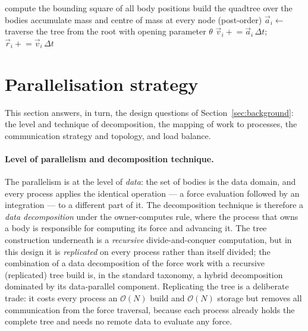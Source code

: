 \documentclass[11pt,a4paper]{article}
\begin{document}
\begin{algorithm}[H]
\caption{One Barnes--Hut time step (sequential).}
\label{alg:serial}
\begin{algorithmic}[1]
\State compute the bounding square of all body positions
\State build the quadtree over the bodies
\State accumulate mass and centre of mass at every node (post-order)
  \State $\vec a_i \gets$ traverse the tree from the root with opening parameter $\theta$
\EndFor
{}
  \State $\vec v_i \mathrel{+}= \vec a_i\,\Delta t$;\quad $\vec r_i \mathrel{+}= \vec v_i\,\Delta t$
\EndFor
\end{algorithmic}
\end{algorithm}

\section{Parallelisation strategy}
\label{sec:parallel}

This section answers, in turn, the design questions of
Section~\ref{sec:background}: the level and technique of decomposition, the mapping
of work to processes, the communication strategy and topology, and load balance.

\paragraph{Level of parallelism and decomposition technique.}
The parallelism is at the level of \emph{data}: the set of bodies is the data
domain, and every process applies the identical operation --- a force evaluation
followed by an integration --- to a different part of it. The decomposition
technique is therefore a \emph{data decomposition} under the owner-computes rule,
where the process that owns a body is responsible for computing its force and
advancing it. The tree construction underneath is a \emph{recursive}
divide-and-conquer computation, but in this design it is \emph{replicated} on
every process rather than itself divided; the combination of a data decomposition
of the force work with a recursive (replicated) tree build is, in the standard
taxonomy, a hybrid decomposition dominated by its data-parallel component.
Replicating the tree is a deliberate trade: it costs every process an
$\mathcal{O}(N)$ build and $\mathcal{O}(N)$ storage but removes all communication
from the force traversal, because each process already holds the complete tree and
needs no remote data to evaluate any force.
\end{document}
